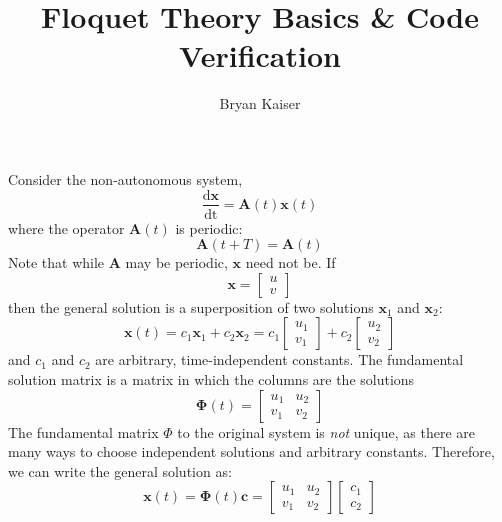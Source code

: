 \documentclass{article}
\title{Floquet Theory Basics \& Code Verification}
\author{Bryan Kaiser}
\begin{document}
\maketitle

Consider the non-autonomous system, 
\begin{equation}
 \frac{\mathrm{d}\mathbf{x}}{\mathrm{dt}}=\mathbf{A}(t)\mathbf{x}(t)
\end{equation}
where the operator $\mathbf{A}(t)$ is periodic:
\begin{equation}
 \mathbf{A}(t+T)=\mathbf{A}(t)
\end{equation}
Note that while $\mathbf{A}$ may be periodic, $\mathbf{x}$ need not be.
If
\begin{equation}
 \mathbf{x}=\begin{bmatrix*}
  u \\
  v
 \end{bmatrix*}
\end{equation}
then the general solution is a superposition of two solutions $\mathbf{x}_1$ and $\mathbf{x}_2$:
\begin{equation}
 \mathbf{x}(t)=c_1\mathbf{x}_1+c_2\mathbf{x}_2
 =c_1\begin{bmatrix*}
  u_1 \\
  v_1
 \end{bmatrix*}+c_2\begin{bmatrix*}
  u_2 \\
  v_2
 \end{bmatrix*}
\end{equation}
and $c_1$ and $c_2$ are arbitrary, time-independent constants.
The fundamental solution matrix is a matrix in which the columns are the solutions
\begin{equation}
 \boldsymbol{\Phi}(t)=\begin{bmatrix*}
 u_1 & u_2 \\
 v_1 & v_2
 \end{bmatrix*}
\end{equation}
The fundamental matrix $\Phi$ to the original system is \textit{not} unique, as there are many ways to 
choose independent solutions and arbitrary constants. 
Therefore, we can write the general solution as:
\begin{equation}
 \mathbf{x}(t)=\boldsymbol{\Phi}(t)\mathbf{c}=\begin{bmatrix*}
 u_1 & u_2 \\
 v_1 & v_2
 \end{bmatrix*}
  \begin{bmatrix*}
  c_1 \\
  c_2
 \end{bmatrix*}
 \label{eq:gen_soln}
\end{equation}
\end{document}
